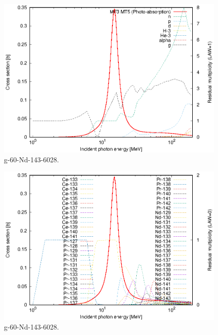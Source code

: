\begin{figure}
 \includegraphics[width=\linewidth]{eps/g_60-Nd-143_6028.eps}
  \caption{g-60-Nd-143-6028.}
\end{figure}
\begin{figure}
 \includegraphics[width=\linewidth]{eps-law0/g_60-Nd-143_6028.eps}
 \caption{g-60-Nd-143-6028.}
\end{figure}
\newpage \clearpage

